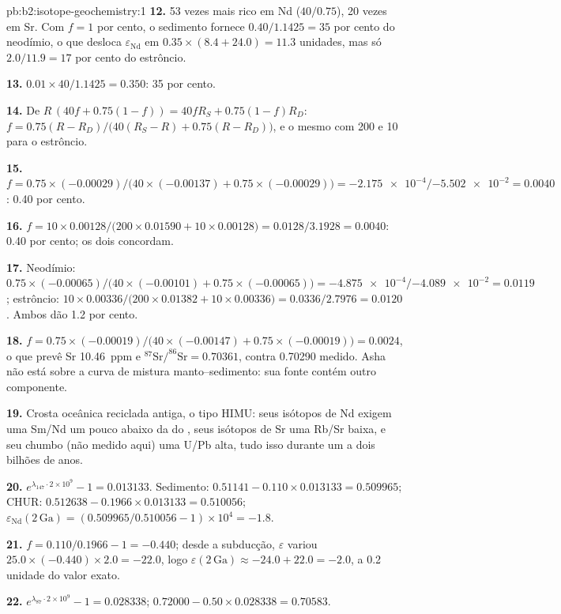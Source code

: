 \begin{solution}{pb:b2:isotope-geochemistry:1}
\textbf{12.} 53 vezes mais rico em Nd ($40/0.75$), 20 vezes em Sr. Com $f = 1$ por cento, o
sedimento fornece $0.40/1.1425 = 35$ por cento do neodímio, o que desloca
$\varepsilon_{\mathrm{Nd}}$ em $0.35\times(8.4 + 24.0) = 11.3$ unidades, mas só $2.0/11.9 =
17$ por cento do estrôncio.

\textbf{13.} $0.01\times40/1.1425 = 0.350$: 35 por cento.

\textbf{14.} De $R\,(40f + 0.75(1-f)) = 40fR_S + 0.75(1-f)R_D$:
$f = 0.75(R - R_D)/\bigl(40(R_S - R) + 0.75(R - R_D)\bigr)$, e o mesmo com 200
e 10 para o estrôncio.

\textbf{15.} $f = 0.75\times(-0.00029)/\bigl(40\times(-0.00137) + 0.75\times(-0.00029)\bigr)
= \num{-2.175e-4}/\num{-5.502e-2} = 0.0040$: 0.40 por cento.

\textbf{16.} $f = 10\times0.00128/\bigl(200\times0.01590 + 10\times0.00128\bigr) =
0.0128/3.1928 = 0.0040$: 0.40 por cento; os dois concordam.

\textbf{17.} Neodímio: $0.75\times(-0.00065)/\bigl(40\times(-0.00101) +
0.75\times(-0.00065)\bigr) = \num{-4.875e-4}/\num{-4.089e-2} = 0.0119$; estrôncio:
$10\times0.00336/\bigl(200\times0.01382 + 10\times0.00336\bigr) = 0.0336/2.7976 = 0.0120$.
Ambos dão 1.2 por cento.

\textbf{18.} $f = 0.75\times(-0.00019)/\bigl(40\times(-0.00147) + 0.75\times(-0.00019)\bigr)
= 0.0024$, o que prevê Sr \qty{10.46}{ppm} e $^{87}\mathrm{Sr}/^{86}\mathrm{Sr} =
0.70361$, contra 0.70290 medido. Asha não está sobre a curva de mistura manto--sedimento:
sua fonte contém outro componente.

\textbf{19.} Crosta oceânica reciclada antiga, o tipo HIMU: seus isótopos de Nd exigem uma Sm/Nd
um pouco abaixo da do , seus isótopos de Sr uma Rb/Sr baixa, e seu
chumbo (não medido aqui) uma U/Pb alta, tudo isso durante um a dois bilhões de anos.

\textbf{20.} $e^{\lambda_{147}\cdot2\times10^9} - 1 = 0.013133$. Sedimento: $0.51141 -
0.110\times0.013133 = 0.509965$; CHUR: $0.512638 - 0.1966\times0.013133 = 0.510056$;
$\varepsilon_{\mathrm{Nd}}(2\,\mathrm{Ga}) = (0.509965/0.510056 - 1)\times10^4 = -1.8$.

\textbf{21.} $f = 0.110/0.1966 - 1 = -0.440$; desde a subducção, $\varepsilon$ variou
$25.0\times(-0.440)\times2.0 = -22.0$, logo $\varepsilon(2\,\mathrm{Ga}) \approx -24.0 + 22.0
= -2.0$, a 0.2 unidade do valor exato.

\textbf{22.} $e^{\lambda_{87}\cdot2\times10^9} - 1 = 0.028338$;
$0.72000 - 0.50\times0.028338 = 0.70583$.


\end{solution}
